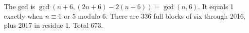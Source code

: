 The gcd is $\gcd(n+6,(2n+6)-2(n+6))=\gcd(n,6)$. It equals 1 exactly when $n\equiv1$ or 5 modulo 6. There are 336 full blocks of six through 2016, plus 2017 in residue 1. Total $\boxed{673}$.
